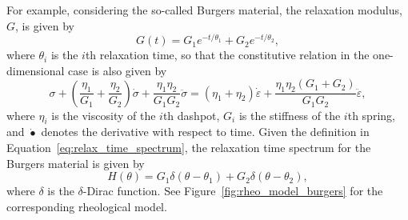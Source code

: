 For example, considering the so-called Burgers material, the relaxation modulus, $G$, is given by \citep{malkinRheologyConceptsMethods2017}
\begin{equation}
\label{eq:relaxation_modulus_burgers}
  G(t)=G_{1} e^{-t / \theta_{1}} + G_2 e^{-t/\theta_2},
\end{equation}
where $\theta_i$ is the $i$th relaxation time, so that the constitutive relation in the one-dimensional case is also given by
\begin{equation}
  \sigma + \left(\frac{\eta_1}{G_1} + \frac{\eta_2}{G_2}\right) \dot \sigma + \frac{\eta_1\eta_2}{G_1G_2}\ddot \sigma = (\eta_1 + \eta_2)\dot\varepsilon + \frac{\eta_1\eta_2(G_1 + G_2)}{G_1G_2}\ddot\varepsilon,
\end{equation}
where $\eta_i$ is the viscosity of the $i$th dashpot, $G_i$ is the stiffness of the $i$th spring, and $\dot{\bullet}$ denotes the derivative with respect to time.
Given the definition in Equation~\eqref{eq:relax_time_spectrum}, the relaxation time spectrum for the Burgers material is given by
\begin{equation}
  H(\theta) = G_1 \delta(\theta - \theta_1) + G_2 \delta(\theta - \theta_2),
\end{equation}
where $\delta$ is the $\delta$-Dirac function.
See Figure~\ref{fig:rheo_model_burgers} for the corresponding rheological model.

